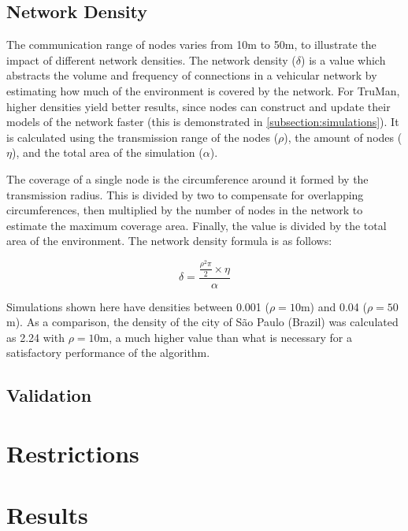 \subsection{Network Density}


The communication range of nodes varies from 10m to 50m, to illustrate the impact of different network densities.
The network density ($\delta$) is a value which abstracts the volume and frequency of connections in a vehicular network by estimating how much of the environment is covered by the network.
For TruMan, higher densities yield better results, since nodes can construct and update their models of the network faster (this is demonstrated in \autoref{subsection:simulations}).
It is calculated using the transmission range of the nodes ($\rho$), the amount of nodes ($\eta$), and the total area of the simulation ($\alpha$).

The coverage of a single node is the circumference around it formed by the transmission radius. This is divided by two to compensate for overlapping circumferences, then multiplied by the number of nodes in the network to estimate the maximum coverage area.
Finally, the value is divided by the total area of the environment.
The network density formula is as follows:

$$ \delta = \frac{\frac{\rho^2\pi}{2} \times \eta}{\alpha} $$

Simulations shown here have densities between 0.001 ($\rho = 10$m) and 0.04 ($\rho = 50$m).
As a comparison, the density of the city of São Paulo (Brazil) was calculated as 2.24 with $\rho = 10$m, a much higher value than what is necessary for a satisfactory performance of the algorithm.

\subsection{Validation}

\section{Restrictions}
\label{section:restrictions}

\section{Results}
\label{section:results}

